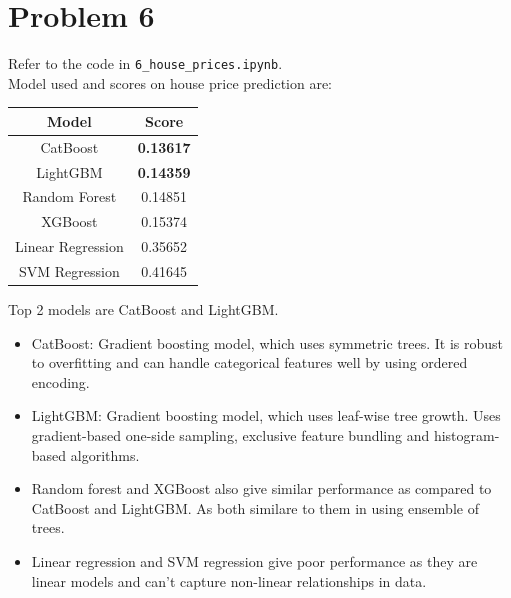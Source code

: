\documentclass[12pt]{article}
\begin{document}
\section*{Problem 6}
Refer to the code in \texttt{6\_house\_prices.ipynb}. \\
Model used and scores on house price prediction are:
\begin{center}
    \begin{tabular}{|c|c|}
        \hline
        Model & Score \\
        \hline
        CatBoost & \textbf{0.13617} \\
        LightGBM & \textbf{0.14359} \\
        Random Forest & 0.14851 \\
        XGBoost & 0.15374 \\
        Linear Regression & 0.35652 \\
        SVM Regression & 0.41645 \\
        \hline
    \end{tabular}
\end{center}

Top 2 models are CatBoost and LightGBM.

\begin{itemize}
    \item CatBoost: Gradient boosting model, which uses symmetric trees. It is robust to overfitting and can handle categorical features well by using ordered encoding.
    \item LightGBM: Gradient boosting model, which uses leaf-wise tree growth. Uses gradient-based one-side sampling, exclusive feature bundling and histogram-based algorithms. 
\end{itemize}

\begin{itemize}
    \item Random forest and XGBoost also give similar performance as compared to CatBoost and LightGBM. As both similare to them in using ensemble of trees.
    \item Linear regression and SVM regression give poor performance as they are linear models and can't capture non-linear relationships in data.
\end{itemize}
\end{document}
